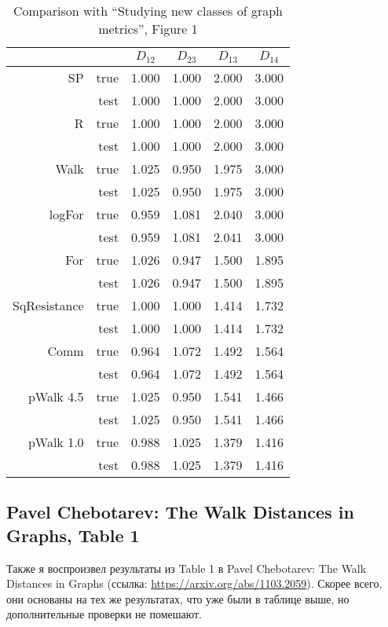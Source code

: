 \documentclass{article}
\begin{document}
\begin{table}[H]
\centering
\caption{Comparison with ``Studying new classes of graph metrics'', Figure 1}
\label{}
\begin{tabular}{rr|cccc}
             &      & $D_{12}$ & $D_{23}$ & $D_{13}$ & $D_{14}$ \\
             \hline
SP           & true & 1.000 & 1.000 & 2.000 & 3.000 \\
             & test & 1.000 & 1.000 & 2.000 & 3.000 \\
             \hline
R            & true & 1.000 & 1.000 & 2.000 & 3.000 \\
             & test & 1.000 & 1.000 & 2.000 & 3.000 \\
             \hline
Walk         & true & 1.025 & 0.950 & 1.975 & 3.000 \\
             & test & 1.025 & 0.950 & 1.975 & 3.000 \\
             \hline
logFor       & true & 0.959 & 1.081 & 2.040 & 3.000 \\
             & test & 0.959 & 1.081 & 2.041 & 3.000 \\
             \hline
For          & true & 1.026 & 0.947 & 1.500 & 1.895 \\
             & test & 1.026 & 0.947 & 1.500 & 1.895 \\
             \hline
SqResistance & true & 1.000 & 1.000 & 1.414 & 1.732 \\
             & test & 1.000 & 1.000 & 1.414 & 1.732 \\
             \hline
Comm         & true & 0.964 & 1.072 & 1.492 & 1.564 \\
             & test & 0.964 & 1.072 & 1.492 & 1.564 \\
             \hline
pWalk 4.5    & true & 1.025 & 0.950 & 1.541 & 1.466 \\
             & test & 1.025 & 0.950 & 1.541 & 1.466 \\
             \hline
pWalk 1.0    & true & 0.988 & 1.025 & 1.379 & 1.416 \\
             & test & 0.988 & 1.025 & 1.379 & 1.416
\end{tabular}
\end{table}

\subsection{Pavel Chebotarev: The Walk Distances in Graphs, Table 1}
Также я воспроизвел результаты из Table 1 в Pavel Chebotarev: The Walk Distances in Graphs (ссылка: \url{https://arxiv.org/abs/1103.2059}). Скорее всего, они основаны на тех же результатах, что уже были в таблице выше, но дополнительные проверки не помешают.
\end{document}
